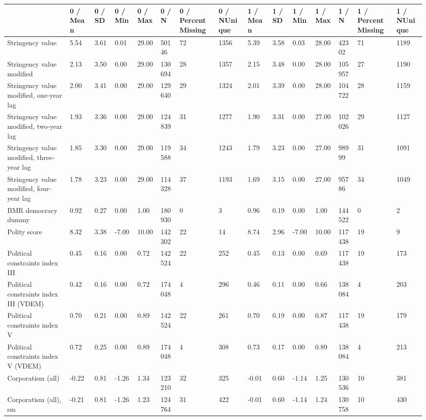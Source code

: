 
\begin{longtable}{lllllllllllllll}
\toprule
  & 0 / Mean & 0 / SD & 0 / Min & 0 / Max & 0 / N & 0 / PercentMissing & 0 / NUnique & 1 / Mean & 1 / SD & 1 / Min & 1 / Max & 1 / N & 1 / PercentMissing & 1 / NUnique\\
\midrule
Stringency value & 5.54 & 3.61 & 0.01 & 29.00 & 50146 & 72 & 1356 & 5.39 & 3.58 & 0.03 & 28.00 & 42302 & 71 & 1189\\
Stringency value modified & 2.13 & 3.50 & 0.00 & 29.00 & 130694 & 28 & 1357 & 2.15 & 3.48 & 0.00 & 28.00 & 105957 & 27 & 1190\\
Stringency value modified, one-year lag & 2.00 & 3.41 & 0.00 & 29.00 & 129640 & 29 & 1324 & 2.01 & 3.39 & 0.00 & 28.00 & 104722 & 28 & 1159\\
Stringency value modified, two-year lag & 1.93 & 3.36 & 0.00 & 29.00 & 124839 & 31 & 1277 & 1.90 & 3.31 & 0.00 & 27.00 & 102026 & 29 & 1127\\
Stringency value modified, three-year lag & 1.85 & 3.30 & 0.00 & 29.00 & 119588 & 34 & 1243 & 1.79 & 3.23 & 0.00 & 27.00 & 98999 & 31 & 1091\\
\addlinespace
Stringency value modified, four-year lag & 1.78 & 3.23 & 0.00 & 29.00 & 114328 & 37 & 1193 & 1.69 & 3.15 & 0.00 & 27.00 & 95786 & 34 & 1049\\
BMR democracy dummy & 0.92 & 0.27 & 0.00 & 1.00 & 180930 & 0 & 3 & 0.96 & 0.19 & 0.00 & 1.00 & 144522 & 0 & 2\\
Polity score & 8.32 & 3.38 & -7.00 & 10.00 & 142302 & 22 & 14 & 8.74 & 2.96 & -7.00 & 10.00 & 117438 & 19 & 9\\
Political constraints index III & 0.45 & 0.16 & 0.00 & 0.72 & 142524 & 22 & 252 & 0.45 & 0.13 & 0.00 & 0.69 & 117438 & 19 & 173\\
Political constraints index III (VDEM) & 0.42 & 0.16 & 0.00 & 0.72 & 174048 & 4 & 296 & 0.46 & 0.11 & 0.00 & 0.66 & 138084 & 4 & 203\\
\addlinespace
Political constraints index V & 0.70 & 0.21 & 0.00 & 0.89 & 142524 & 22 & 261 & 0.70 & 0.19 & 0.00 & 0.87 & 117438 & 19 & 179\\
Political constraints index V (VDEM) & 0.72 & 0.25 & 0.00 & 0.89 & 174048 & 4 & 308 & 0.73 & 0.17 & 0.00 & 0.89 & 138084 & 4 & 213\\
Corporatism (all) & -0.22 & 0.81 & -1.26 & 1.34 & 123210 & 32 & 325 & -0.01 & 0.60 & -1.14 & 1.25 & 130536 & 10 & 381\\
Corporatism (all), sm & -0.21 & 0.81 & -1.26 & 1.23 & 124764 & 31 & 422 & -0.01 & 0.60 & -1.14 & 1.24 & 130758 & 10 & 430\\

\end{longtable}
